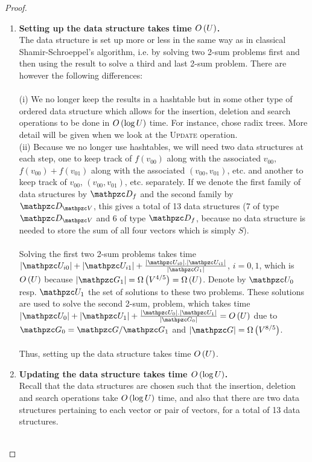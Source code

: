 \begin{proof}
$~$\\
\begin{enumerate}
\item \textbf{Setting up the data structure takes time $O\left( U \right)$.\\}
The data structure is set up more or less in the same way as in classical Shamir-Schroeppel's algorithm, i.e. by solving two 2-sum problems first and then using the result to solve a third and last 2-sum problem. There are however the following differences:\\ \\
(i) We no longer keep the results in a hashtable but in some other type of ordered data structure which allows for the insertion, deletion and search operations to be done in $O\left( \log U \right)$ time. For instance, \cite{BJLM13} chose radix trees. More detail will be given when we look at the \textsc{Update} operation.\\
(ii) Because we no longer use hashtables, we will need two data structures at each step, one to keep track of $f(v_{00})$ along with the associated $v_{00}$, $f(v_{00}) + f(v_{01})$ along with the associated $(v_{00},v_{01})$, etc. and another to keep track of $v_{00}$, $(v_{00}, v_{01})$, etc. separately. If we denote the first family of data structures by $\zD_f$ and the second family by $\zD_{\zV}$, this gives a total of 13 data structures (7 of type $\zD_{\zV}$ and 6 of type $\zD_f$, because no data structure is needed to  
store the sum of all four vectors which is simply $S$).\\ \\
Solving the first two 2-sum problems takes time $|\zU_{i0}| + |\zU_{i1}| + \frac{|\zU_{i0}|.|\zU_{i1}|}{|\zG_1|}$,
$i=0,1$, which is $O\left( U \right)$ because $|\zG_1| = \Om{V^{4/5}} = \Om{U}$. 
Denote by $\zU_{0}$ resp. $\zU_{1}$ the set of solutions to these two problems. These solutions are used to solve the second 2-sum, problem, which takes time 
$|\zU_{0}| + |\zU_{1}| + \frac{|\zU_{0}|.|\zU_{1}|}{|\zG_0|} = \OO{U}$ 
due to 
$\zG_0 = \zG / \zG_1$ 
and $|\zG| = \Om{V^{8/5}}$.\\ \\
Thus, setting up the data structure takes time $O\left( U \right)$.
\item \textbf{Updating the data structure takes time $O\left( \log U \right)$.\\}
Recall that the data structures are chosen such that the insertion, deletion and search operations take $O\left( \log U \right)$ time, and also that there are two data structures pertaining to each vector or pair of vectors, for a total of 13 data structures.\\ \\

\end{enumerate}
\end{proof}
